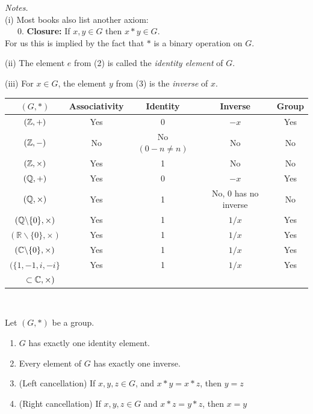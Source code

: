 \emph{Notes.}\\
 (i) Most books also list another axiom:\\ \vspace*{5pt}
~~~0. \textbf{Closure: }If $x,y \in G$ then $x * y \in G$.\\
For us this is implied by the fact that $*$ is a binary operation on $G$.

(ii) The element $e$ from (2) is called the \emph{identity element} of $G$.

(iii) For $x \in G$, the element $y$ from (3) is the \emph{inverse} of $x$.\\

\begin{examples}
{\renewcommand{\arraystretch}{1.3}
\begin{table}[H]
\centering
    \begin{tabular}{ccccc}
    \hline
    $(G, *)$ & Associativity & Identity & Inverse & Group \\ \hline
    $(\mathbb{Z},+)$ & Yes & $0$ & $-x$ & Yes \\
    $(\mathbb{Z},-) $  & No & No {\tiny $(0 -n \neq n)$} & No & No\\
    $(\mathbb{Z}, \times)$ & Yes & 1 & No & No \\
    $(\mathbb{Q}, +)$ & Yes & $0$ & $-x$ & Yes\\
    $(\mathbb{Q},\times)$ & Yes & 1 & No, {\tiny 0 has no inverse} & No\\
    $(\mathbb{Q}\backslash\{0\},\times)$ & Yes & 1 & $1/x$ & Yes\\ 
    $( \mathbb{R}\backslash\{0\},\times)$ & Yes & 1 & $1/x$ & Yes\\ 
    $(\mathbb{C} \backslash\{0\},\times)$ & Yes & 1 & $1/x$ & Yes\\ 
    $(\{1,-1,i,-i\}$ & Yes & 1 & $1/x$ & Yes\vspace*{-5pt}\\ 
   $ ~~~~\subset \mathbb{C}, \times)$ &  & & & 
    \end{tabular}
\end{table}
}
\end{examples}~

\begin{proposition} Let $(G,*)$ be a group. \begin{enumerate}
 \item $G$ has exactly one identity element.
 \item Every element of $G$ has exactly one inverse.
 \item (Left cancellation) If $x,y,z \in G$, and $x*y = x*z$, then $y = z$
 \item (Right cancellation) If $x,y,z \in G$ and $x*z = y*z$, then $x = y$
 \end{enumerate}
 \end{proposition}

